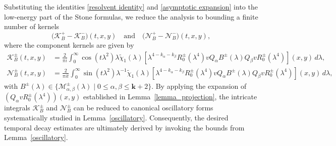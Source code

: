 \documentclass[reqno]{amsart}
\numberwithin{equation}{section}
\begin{document}
Substituting the identities \eqref{resolvent identity} and \eqref{asymptotic expansion} into the low-energy part of the Stone formulas, we reduce the analysis to bounding a finite number of kernels
\begin{equation*}
	\big(\mathcal{K}_{B}^+ - \mathcal{K}_{B}^-\big)(t,x,y) \quad \text{and} \quad \big(\mathcal{N}_{B}^+ - \mathcal{N}_{B}^-\big)(t,x,y) ,
\end{equation*}
where the component kernels are given by
\begin{align*}
	\mathcal{K}_{B}^\pm(t,x,y) &= \frac{2}{\pi i}\int_0^{\infty} \cos(t \lambda^2)\lambda \widetilde{\chi}_1(\lambda) \left[\lambda^{4-k_\alpha-k_\beta} R_0^\pm(\lambda^{4})v Q_\alpha B^\pm(\lambda)Q_\beta vR_0^\pm(\lambda^{4})\right](x,y) \, d \lambda, \\
	\mathcal{N}_{B}^\pm(t,x,y) &= \frac{2}{\pi it}\int_0^{\infty} \sin(t\lambda^2)\lambda^{-1}\widetilde{\chi}_1(\lambda)
	\left[\lambda^{4-k_\alpha-k_\beta} R_0^\pm(\lambda^{4})v Q_\alpha B^\pm(\lambda) Q_\beta vR_0^\pm(\lambda^{4})\right](x,y) \, d \lambda,
\end{align*}
with $B^\pm(\lambda) \in \{ \mathcal{M}_{\alpha, \beta}^{\pm}(\lambda) \mid 0 \le \alpha,\beta \le \mathbf{k}+2 \}$. By applying the expansion of $(Q_\alpha v R_0^\pm(\lambda^4))(x,y)$ established in Lemma~\ref{lemma_projection}, the intricate integrals $\mathcal{K}_{B}^\pm$ and $\mathcal{N}_{B}^\pm$ can be reduced to canonical oscillatory forms systematically studied in Lemma~\ref{oscillatory}.
 Consequently, the desired temporal decay estimates are ultimately derived by invoking the  bounds from Lemma~\ref{oscillatory}.
\end{document}
